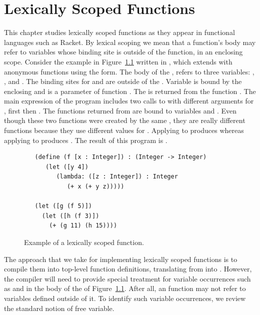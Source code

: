 \documentclass[11pt]{book}
\begin{document}


\chapter{Lexically Scoped Functions}
\label{ch:Rlam}

This chapter studies lexically scoped functions as they appear in
functional languages such as Racket. By lexical scoping we mean that a
function's body may refer to variables whose binding site is outside
of the function, in an enclosing scope.
%
Consider the example in Figure~\ref{fig:lexical-scoping} written in
\LangLam{}, which extends \LangFun{} with anonymous functions using the
 form.  The body of the , refers to three
variables: , , and . The binding sites for
 and  are outside of the . Variable
 is bound by the enclosing  and  is a
parameter of function . The  is returned from the
function . The main expression of the program includes two
calls to  with different arguments for , first
 then . The functions returned from  are bound
to variables  and . Even though these two functions
were created by the same , they are really different
functions because they use different values for . Applying
 to  produces  whereas applying  to
 produces . The result of this program is .

\begin{figure}[btp]
\begin{lstlisting}
   (define (f [x : Integer]) : (Integer -> Integer)
      (let ([y 4])
         (lambda: ([z : Integer]) : Integer
            (+ x (+ y z)))))

   (let ([g (f 5)])
     (let ([h (f 3)])
       (+ (g 11) (h 15))))
\end{lstlisting}
\caption{Example of a lexically scoped function.}
\label{fig:lexical-scoping}
\end{figure}


The approach that we take for implementing lexically scoped
functions is to compile them into top-level function definitions,
translating from \LangLam{} into \LangFun{}.  However, the compiler will need to
provide special treatment for variable occurrences such as 
and  in the body of the  of
Figure~\ref{fig:lexical-scoping}. After all, an \LangFun{} function may not
refer to variables defined outside of it. To identify such variable
occurrences, we review the standard notion of free variable.
\end{document}

